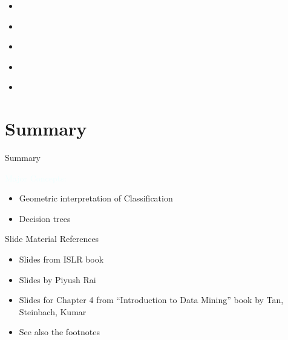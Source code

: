 \documentclass{beamer}
\newcommand{\tblue}[1]{{\Large {\textcolor{azure}{#1}}}}
\begin{document}
\begin{frame}{}
    \begin{itemize}
        \item 
    \end{itemize}
\end{frame}


\begin{frame}{}
    \begin{itemize}
        \item 
    \end{itemize}
\end{frame}


\begin{frame}{}
    \begin{itemize}
        \item 
    \end{itemize}
\end{frame}


\begin{frame}{}
    \begin{itemize}
        \item 
    \end{itemize}
\end{frame}


\begin{frame}{}
    \begin{itemize}
        \item 
    \end{itemize}
\end{frame}


\section{Summary}
\begin{frame}{Summary}

\tblue{Major Concepts:}
\begin{itemize}
    \item Geometric interpretation of Classification
    \item Decision trees
\end{itemize}
\end{frame}

\begin{frame}{Slide Material References}
\begin{itemize}
    \item Slides from ISLR book
    \item Slides by Piyush Rai
    \item Slides for Chapter 4 from ``Introduction to Data Mining'' book by Tan, Steinbach, Kumar
    \item See also the footnotes
\end{itemize}
\end{frame}
\end{document}

